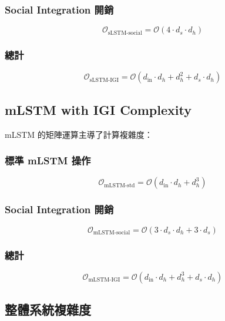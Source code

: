\documentclass[11pt,a4paper]{article}
\begin{document}
\subsubsection{Social Integration 開銷}
\begin{equation}
\mathcal{O}_{\text{sLSTM-social}} = \mathcal{O}(4 \cdot d_s \cdot d_h)
\end{equation}

\subsubsection{總計}
\begin{equation}
\mathcal{O}_{\text{sLSTM-IGI}} = \mathcal{O}(d_{\text{in}} \cdot d_h + d_h^2 + d_s \cdot d_h)
\end{equation}

\subsection{mLSTM with IGI Complexity}

mLSTM 的矩陣運算主導了計算複雜度：

\subsubsection{標準 mLSTM 操作}
\begin{equation}
\mathcal{O}_{\text{mLSTM-std}} = \mathcal{O}(d_{\text{in}} \cdot d_h + d_h^3)
\end{equation}

\subsubsection{Social Integration 開銷}
\begin{equation}
\mathcal{O}_{\text{mLSTM-social}} = \mathcal{O}(3 \cdot d_s \cdot d_h + 3 \cdot d_s)
\end{equation}

\subsubsection{總計}
\begin{equation}
\mathcal{O}_{\text{mLSTM-IGI}} = \mathcal{O}(d_{\text{in}} \cdot d_h + d_h^3 + d_s \cdot d_h)
\end{equation}

\subsection{整體系統複雜度}
\end{document}
